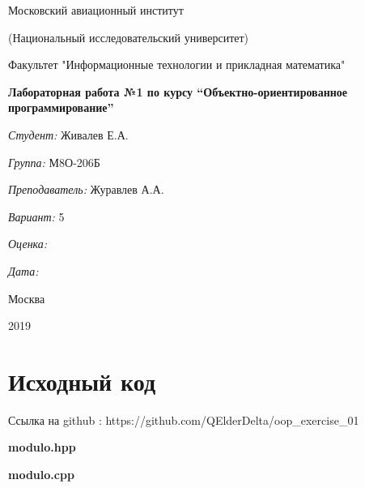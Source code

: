 \documentclass[a4paper, 12pt]{article}
\begin{document}
\thispagestyle{empty}	
\begin{center}
	Московский авиационный институт
	
	(Национальный исследовательский университет)
	
	Факультет "Информационные технологии и прикладная математика"
	
\end{center}
\vspace{40ex}
\begin{center}
	\textbf{\large{Лабораторная работа №1 по курсу \textquotedblleft Объектно-ориентированное программирование\textquotedblright}}
\end{center}
\vspace{40ex}
\begin{flushright}
	\textit{Студент: } Живалев Е.А.
	
	\vspace{2ex}
	\textit{Группа: } М8О-206Б
	
	\vspace{2ex}
	\textit{Преподаватель: } Журавлев А.А.
	
	\vspace{2ex}
	\textit{Вариант: } 5
	
	\vspace{2ex}
	\textit{Оценка: } \underline{\quad\quad\quad\quad\quad\quad}
	
	 \vspace{2ex}
	\textit{Дата: } \underline{\quad\quad\quad\quad\quad\quad}
	
\end{flushright}

\begin{vfill}
	\begin{center}
		Москва
		
		2019
	\end{center}	
\end{vfill}
\newpage
\section{Исходный код}

Ссылка на github : https://github.com/QElderDelta/oop\_exercise\_01

\vspace{3ex}
\textbf{\large{modulo.hpp}}


\vspace{3ex}
\textbf{\large{modulo.cpp}}

\end{document}
